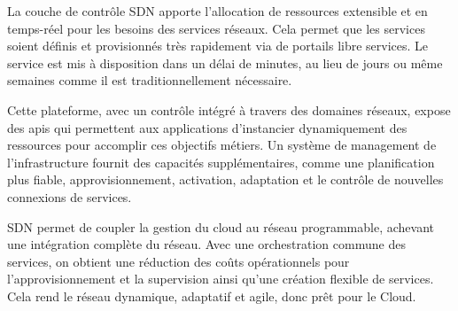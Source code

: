 
La couche de contrôle SDN apporte l'allocation de ressources extensible et en temps-réel pour les besoins des services réseaux. Cela permet que les services soient définis et provisionnés très rapidement via de portails libre services. Le service est mis à disposition dans un délai de minutes, au lieu de jours ou même semaines comme il est traditionnellement nécessaire.

Cette plateforme, avec un contrôle intégré à travers des domaines réseaux, expose des \glspl{api} qui permettent aux applications d'instancier dynamiquement des ressources pour accomplir ces objectifs métiers. Un  système de management de l'infrastructure fournit des capacités supplémentaires, comme une planification plus fiable, approvisionnement, activation, adaptation et le contrôle de nouvelles connexions de services.

SDN permet de coupler la gestion du cloud au réseau programmable, achevant une intégration complète du réseau. Avec une orchestration commune des services, on obtient une réduction des coûts opérationnels pour l'approvisionnement et la supervision ainsi qu'une création flexible de services. Cela rend le réseau dynamique, adaptatif et agile, donc prêt pour le Cloud. \cite{OFSDNNFVand} \cite{realTimeCloudNetworkEnabled} 

